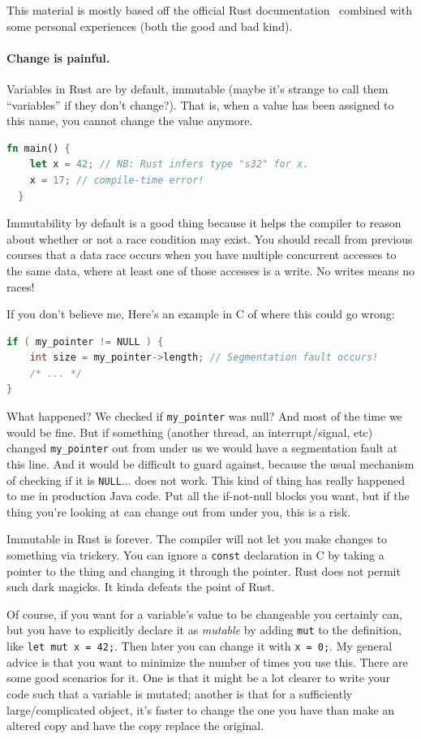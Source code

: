 \documentclass[a4paper]{report}
\begin{document}
This material is mostly based off the official Rust documentation~\cite{rustdocs} combined with some personal experiences (both the good and bad kind). 

\paragraph{Change is painful.}
Variables in Rust are by default, immutable (maybe it's strange to call them ``variables'' if they don't change?). That is, when a value has been assigned to this name, you cannot change the value anymore.
\begin{lstlisting}[language=Rust]
  fn main() {
    let x = 42; // NB: Rust infers type "s32" for x.
    x = 17; // compile-time error!
  }
\end{lstlisting}

Immutability by default is a good thing because it helps the compiler to reason about whether or not a race condition may exist. You should recall from previous courses that a data race occurs when you have multiple concurrent accesses to the same data, where at least one of those accesses is a write. No writes means no races! 

If you don't believe me, Here's an example in C of where this could go wrong:
\begin{lstlisting}[language=C]
if ( my_pointer != NULL ) {
    int size = my_pointer->length; // Segmentation fault occurs!
    /* ... */
}
\end{lstlisting}

What happened? We checked if \texttt{my\_pointer} was null? And most of the time we would be fine. But if something (another thread, an interrupt/signal, etc) changed \texttt{my\_pointer} out from under us we would have a segmentation fault at this line. And it would be difficult to guard against, because the usual mechanism of checking if it is \texttt{NULL}... does not work. This kind of thing has really happened to me in production Java code. Put all the if-not-null blocks you want, but if the thing you're looking at can change out from under you, this is a risk.

Immutable in Rust is forever. The compiler will not let you make changes to something via trickery. You can ignore a \texttt{const} declaration in C by taking a pointer to the thing and changing it through the pointer. Rust does not permit such dark magicks. It kinda defeats the point of Rust.

Of course, if you want for a variable's value to be changeable you certainly can, but you have to explicitly declare it as \textit{mutable} by adding \texttt{mut} to the definition, like \texttt{let mut x = 42;}. Then later you can change it with \texttt{x = 0;}. My general advice is that you want to minimize the number of times you use this. There are some good scenarios for it. One is that it might be a lot clearer to write your code such that a variable is mutated; another is that for a sufficiently large/complicated object, it's faster to change the one you have than make an altered copy and have the copy replace the original.
\end{document}
